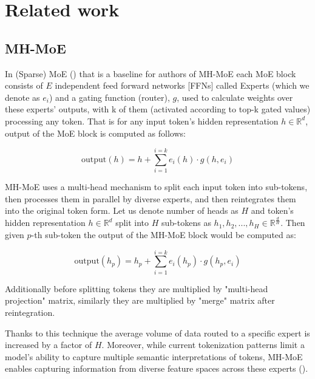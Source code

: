 \documentclass[12pt]{article}
\begin{document}
\section{Related work}

\subsection{MH-MoE} 
In (Sparse) MoE (\cite{shazeer2017outrageously}) that is a baseline for authors of MH-MoE each MoE block consists of $E$ independent feed forward networks [FFNs] called Experts (which we denote as $e_i$) and a gating function (router), $g$, used to calculate weights over these experts' outputs, with k of them (activated according to top-k gated values) processing any token. That is for any input token's hidden representation $h \in \mathbb{R}^d$, output of the MoE block is computed as follows:

\[ \text{output}(h)=h+\sum_{i=1}^{i=k} e_i (h)  \cdot g(h, e_i)\]

MH-MoE uses a multi-head mechanism to split each input token into sub-tokens, then processes them in parallel by diverse experts, and then reintegrates them into the original token form. Let us denote number of heads as $H$ and token's hidden representation $h \in \mathbb{R}^d $ split into $H$ sub-tokens as $h_1,h_2,...,h_H \in \mathbb{R}^{\frac{d}{H}} $. Then given $p$-th sub-token the output of the MH-MoE block would be computed as:

\[ \text{output}(h_p)= h_p + \sum_{i=1}^{i=k} e_i (h_p)  \cdot g(h_p,e_i)\]

Additionally before splitting tokens they are multiplied by "multi-head projection" matrix, similarly they are multiplied by "merge" matrix after reintegration.

Thanks to this technique the average volume of data routed to a specific expert is increased by a factor of $H$.
Moreover, while current tokenization patterns limit a model's ability to capture multiple semantic interpretations of tokens, MH-MoE enables capturing information from diverse feature spaces across these experts (\cite{wu2024multihead}).
\end{document}
